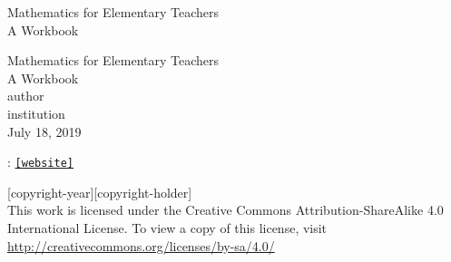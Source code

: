 \documentclass[twoside,11pt,]{book}
\newcommand{\mono}[1]{\texttt{#1}}
\begin{document}
\frontmatter
\thispagestyle{empty}
{\centering
\vspace*{0.28\textheight}
{\Huge Mathematics for Elementary Teachers}\\[2\baselineskip]
{\LARGE A Workbook}\\
}
\clearpage
\thispagestyle{empty}
\null%
\clearpage
\thispagestyle{empty}
{\centering
\vspace*{0.14\textheight}
{\Huge Mathematics for Elementary Teachers}\\[\baselineskip]
{\LARGE A Workbook}\\[3\baselineskip]
{\Large \textbraceleft{}author\textbraceright{}}\\[0.5\baselineskip]
{\Large \textbraceleft{}institution\textbraceright{}}\\[3\baselineskip]
{\Large July 18, 2019}\\}
\clearpage
\thispagestyle{empty}
\hypertarget{g:colophon:idm446364389856}{}
: \href{[website]}{\mono{[website]}}\par\medskip
\noindent\textcopyright{}[copyright-year]\quad{}[copyright-holder]\\[0.5\baselineskip]
 This work is licensed under the Creative Commons Attribution-ShareAlike 4.0 International License. To view a copy of this license, visit \href{http://creativecommons.org/licenses/by-sa/4.0/}{http:\slash{}\slash{}creativecommons.org\slash{}licenses\slash{}by-sa\slash{}4.0\slash{}}\par\medskip
{}
\null\clearpage
\setcounter{tocdepth}{2}
\renewcommand*\contentsname{Contents}
\tableofcontents
\mainmatter
%
%
\typeout{************************************************}
\typeout{************************************************}
%
\end{document}
